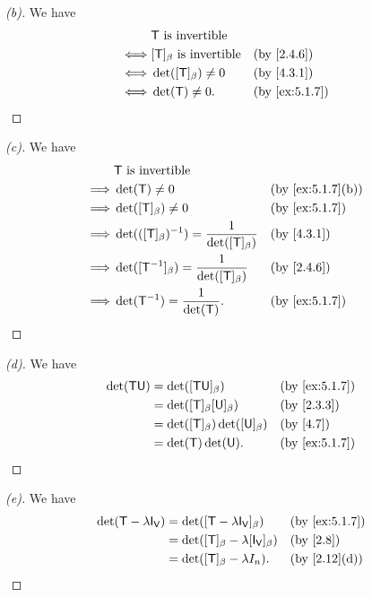 \begin{proof}[(b)]
  We have
  \begin{align*}
         & \T \text{ is invertible}                              \\
    \iff & [\T]_{\beta} \text{ is invertible} &  & \by{2.4.6}    \\
    \iff & \det([\T]_{\beta}) \neq 0          &  & \by{4.3.1}    \\
    \iff & \det(\T) \neq 0.                   &  & \by{ex:5.1.7}
  \end{align*}
\end{proof}

\begin{proof}[(c)]
  We have
  \begin{align*}
             & \T \text{ is invertible}                                                       \\
    \implies & \det(\T) \neq 0                                          &  & \by{ex:5.1.7}[b] \\
    \implies & \det([\T]_{\beta}) \neq 0                                &  & \by{ex:5.1.7}    \\
    \implies & \det(([\T]_{\beta})^{-1}) = \frac{1}{\det([\T]_{\beta})} &  & \by{4.3.1}       \\
    \implies & \det([\T^{-1}]_{\beta}) = \frac{1}{\det([\T]_{\beta})}   &  & \by{2.4.6}       \\
    \implies & \det(\T^{-1}) = \frac{1}{\det(\T)}.                      &  & \by{ex:5.1.7}
  \end{align*}
\end{proof}

\begin{proof}[(d)]
  We have
  \begin{align*}
    \det(\T \U) & = \det([\T \U]_{\beta})                 &  & \by{ex:5.1.7} \\
                & = \det([\T]_{\beta} [\U]_{\beta})       &  & \by{2.3.3}    \\
                & = \det([\T]_{\beta}) \det([\U]_{\beta}) &  & \by{4.7}      \\
                & = \det(\T) \det(\U).                    &  & \by{ex:5.1.7}
  \end{align*}
\end{proof}

\begin{proof}[(e)]
  We have
  \begin{align*}
    \det(\T - \lambda \IT[\V]) & = \det([\T - \lambda \IT[\V]]_{\beta})           &  & \by{ex:5.1.7} \\
                               & = \det([\T]_{\beta} - \lambda [\IT[\V]]_{\beta}) &  & \by{2.8}      \\
                               & = \det([\T]_{\beta} - \lambda I_n).              &  & \by{2.12}[d]
  \end{align*}
\end{proof}

